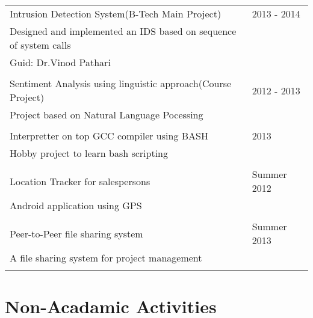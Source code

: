 \documentclass[a4paper,10pt]{article} %
\begin{document}
\begin{tabular}{p{11cm}p{11cm}}	
        \textsf{Intrusion Detection System(B-Tech Main Project)}                   & \textsf{2013 - 2014} \\
        \textsf{Designed and implemented an IDS based on sequence of system calls} & \\
        \textsf{Guid: Dr.Vinod Pathari}                                            & \\
                                                                                   & \\

        \textsf{Sentiment Analysis using linguistic approach(Course Project)} & \textsf{2012 - 2013} \\
        \textsf{Project based on Natural Language Pocessing}                  & \\
                                                                              & \\

        \textsf{Interpretter on top GCC compiler using BASH} & \textsf{2013} \\
        \textsf{Hobby project to learn bash scripting}       & \\
                                                             & \\

        \textsf{Location Tracker for salespersons} & \textsf{Summer 2012} \\
        \textsf{Android application using GPS}     & \\
                                                   & \\

        \textsf{Peer-to-Peer file sharing system}             & \textsf{Summer 2013} \\
        \textsf{A file sharing system for project management} & \\
                                                              & \\
\end{tabular}



\section{Non-Acadamic Activities}
\end{document}

